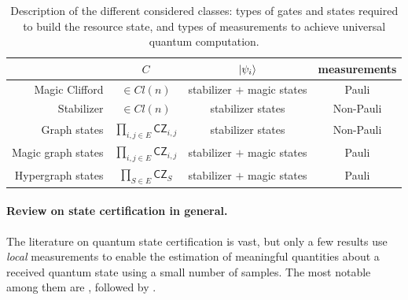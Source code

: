 \documentclass[11pt]{article}
\newcommand{\CZ}{\mathsf{CZ}}
\begin{document}
\begin{table}[h]
    \centering
    \begin{tabular}{r|cc|c}
        & $C$ & $\ket{\psi_i}$& measurements\\
        \hline
        Magic Clifford & $\in Cl(n)$ & stabilizer $+$ magic states&  Pauli\\
        Stabilizer & $\in Cl(n)$ & stabilizer states & Non-Pauli\\
        \hline
        Graph states & $\prod_{i,j\in E} \CZ_{i,j}$  & stabilizer states & Non-Pauli \\
        Magic graph states & $\prod_{i,j\in E} \CZ_{i,j}$  & stabilizer $+$ magic states & Pauli \\
        Hypergraph states & $\prod_{S \in E} \CZ_{S}$  & stabilizer $+$ magic states & Pauli\\
    \end{tabular}
    \caption{Description of the different considered classes: types of gates and states required to build the resource state, and types of measurements to achieve universal quantum computation.}
\end{table}
\paragraph{Review on state certification in general.}
The literature on quantum state certification is vast, but only a few results use \emph{local} measurements to enable the estimation of meaningful quantities about a received quantum state using a small number of samples. The most notable among them are \cite{HPS24certifying}, followed by \cite{GHO25few,LZ25universal}.
\end{document}
